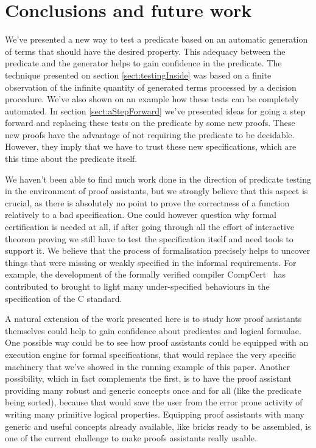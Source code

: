 \section{Conclusions and future work}


We've presented a new way to test a predicate based on an automatic generation of terms that should have the desired property. This adequacy between the predicate and the generator helps to gain confidence in the predicate. The technique presented on section \ref{sect:testingInside} was based on a finite observation of the infinite quantity of generated terms processed by a decision procedure. We've also shown on an example how these tests can be completely automated. In section \ref{sect:aStepForward} we've presented ideas for going a step forward and replacing these tests on the predicate by some new proofs. These new proofs have the advantage of not requiring the predicate to be decidable. However, they imply that we have to trust these new specifications, which are this time about the predicate itself.

We haven't been able to find much work done in the direction of predicate testing in the environment of proof assistants, but we strongly believe that this aspect is crucial, as there is absolutely no point to prove the correctness of a function relatively to a bad specification. One could however question why formal certification is needed at all, if after going through all the effort of interactive theorem proving we still have to test the specification itself and need tools to support it. We believe that the process of formalisation precisely helps to uncover things that were missing or weakly specified in the informal requirements. For example, the development of the formally verified compiler CompCert~\cite{Krebbers2014} has contributed to brought to light many under-specified behaviours in the specification of the C standard.

A natural extension of the work presented here is to study how proof assistants themselves could help to gain confidence about predicates and logical formulae. One possible way could be to see how proof assistants could be equipped with an execution engine for formal specifications, that would replace the very specific machinery that we've showed in the running example of this paper. Another possibility, which in fact complements the first, is to have the proof assistant providing many robust and generic concepts once and for all (like the predicate being sorted), because that would save the user from the error prone activity of writing many primitive logical properties. Equipping proof assistants with many generic and useful concepts already available, like bricks ready to be assembled, is one of the current challenge to make proofs assistants really usable.